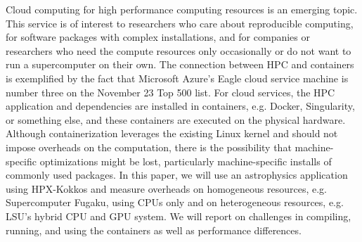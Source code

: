 Cloud computing for high performance computing resources is an emerging topic. This service is of interest to researchers who care about reproducible computing, for software packages with complex installations, and for companies or researchers who need the compute resources only occasionally or do not want to run a supercomputer on their own. The connection between HPC and containers is exemplified by the fact that Microsoft Azure's Eagle cloud service machine is number three on the November 23 Top 500 list. For cloud services, the HPC application and dependencies are installed in containers, e.g. Docker, Singularity, or something else, and these containers are executed on the physical hardware. Although containerization leverages the existing Linux kernel and should not impose overheads on the computation, there is the possibility that machine-specific optimizations might be lost, particularly machine-specific installs of commonly used packages. In this paper, we will use an astrophysics application using HPX-Kokkos and measure overheads on homogeneous resources, e.g. Supercomputer Fugaku, using CPUs only and on heterogeneous resources, e.g. LSU's hybrid CPU and GPU system. We will report on challenges in compiling, running, and using the containers as well as performance differences.
